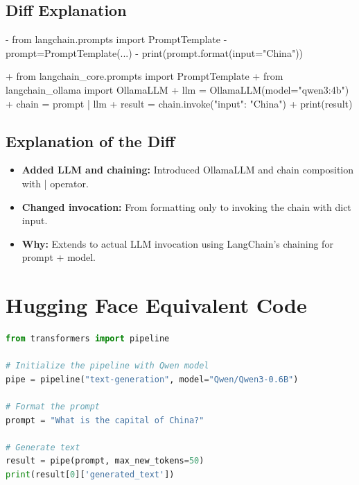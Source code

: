 \documentclass[11pt, a4paper]{article}
\begin{document}
\subsection{Diff Explanation}
\begin{removedcode}
\begin{diffverb}
- from langchain.prompts import PromptTemplate
- prompt=PromptTemplate(...)
- print(prompt.format(input="China"))
\end{diffverb}
\end{removedcode}

\begin{addedcode}
\begin{diffverb}
+ from langchain_core.prompts import PromptTemplate
+ from langchain_ollama import OllamaLLM
+ llm = OllamaLLM(model="qwen3:4b")
+ chain = prompt | llm
+ result = chain.invoke({"input": "China"})
+ print(result)
\end{diffverb}
\end{addedcode}


\subsection{Explanation of the Diff}
\begin{itemize}
    \item \textbf{Added LLM and chaining:} Introduced OllamaLLM and chain composition with | operator.
    \item \textbf{Changed invocation:} From formatting only to invoking the chain with dict input.
    \item \textbf{Why:} Extends to actual LLM invocation using LangChain's chaining for prompt + model.
\end{itemize}

\section{Hugging Face Equivalent Code}
\begin{lstlisting}[language=Python]
from transformers import pipeline

# Initialize the pipeline with Qwen model
pipe = pipeline("text-generation", model="Qwen/Qwen3-0.6B")

# Format the prompt
prompt = "What is the capital of China?"

# Generate text
result = pipe(prompt, max_new_tokens=50)
print(result[0]['generated_text'])
\end{lstlisting}
\end{document}
